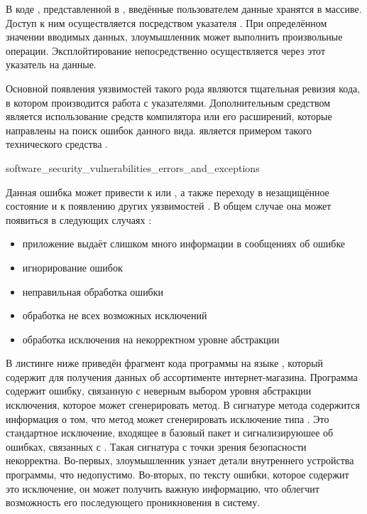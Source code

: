 %
В коде , представленной в , введённые пользователем данные хранятся в массиве.
%
Доступ к ним осуществляется посредством указателя . 
%
При определённом значении вводимых данных, злоумышленник может выполнить произвольные операции. 
%
Эксплойтирование непосредственно осуществляется через этот указатель на данные.

%
Основной  появления уязвимостей такого рода являются тщательная ревизия кода, в котором производится работа с указателями. 
%
Дополнительным средством является использование средств компилятора или его расширений, которые направлены на поиск ошибок данного вида. 
%
 является примером такого технического средства . 


	{software_security_vulnerabilities_errors_and_exceptions}

%
Данная ошибка может привести к  или , а также переходу в незащищённое состояние и к появлению других уязвимостей  . 
%
В общем случае она может появиться в следующих случаях :
\begin{itemize}
	\item приложение выдаёт слишком много информации в сообщениях об ошибке 
	\item игнорирование ошибок 
	\item неправильная обработка ошибки 
	\item обработка не всех возможных исключений 
	\item обработка исключения на некорректном уровне абстракции 
\end{itemize}

%
В листинге ниже приведён фрагмент кода программы на языке , который содержит  для получения данных об ассортименте интернет-магазина. 
%
Программа содержит ошибку, связанную с неверным выбором уровня абстракции исключения, которое может сгенерировать метод. 
%
В сигнатуре метода  содержится информация о том, что метод может сгенерировать исключение типа . 
%
Это стандартное исключение, входящее в базовый пакет  и сигнализируюшее об ошибках, связанных 
с . 
%
Такая сигнатура с точки зрения безопасности некорректна. 
%
Во-первых, злоумышленник узнает детали внутреннего устройства программы, что недопустимо. 
%
Во-вторых, по тексту ошибки, которое содержит это исключение, он может получить важную информацию, что облегчит возможность его последующего проникновения в систему. 


